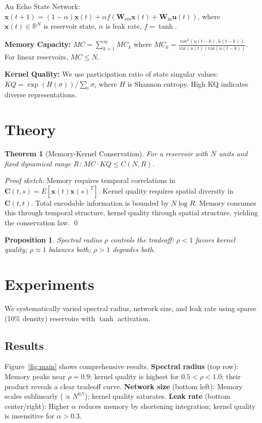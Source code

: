 \documentclass[11pt]{article}
\newtheorem{theorem}{Theorem}
\newtheorem{proposition}{Proposition}
\begin{document}
An Echo State Network: $\mathbf{x}(t+1) = (1-\alpha)\mathbf{x}(t) + \alpha f(\mathbf{W}_{\text{res}}\mathbf{x}(t) + \mathbf{W}_{\text{in}}\mathbf{u}(t))$, where $\mathbf{x}(t) \in \mathbb{R}^N$ is reservoir state, $\alpha$ is leak rate, $f = \tanh$.

\textbf{Memory Capacity:} $MC = \sum_{k=1}^{\infty} MC_k$ where $MC_k = \frac{\text{cov}^2(u(t-k), \hat{u}(t-k))}{\text{var}(u(t))\text{var}(\hat{u}(t-k))}$. For linear reservoirs, $MC \leq N$.

\textbf{Kernel Quality:} We use participation ratio of state singular values: $KQ = \exp(H(\sigma)) / \sum_i \sigma_i$ where $H$ is Shannon entropy. High KQ indicates diverse representations.

\section{Theory}

\begin{theorem}[Memory-Kernel Conservation]
For a reservoir with $N$ units and fixed dynamical range $R$: $MC \cdot KQ \leq C(N, R)$.
\end{theorem}

\textit{Proof sketch:} Memory requires temporal correlations in $\mathbf{C}(t,s) = E[\mathbf{x}(t)\mathbf{x}(s)^T]$. Kernel quality requires spatial diversity in $\mathbf{C}(t,t)$. Total encodable information is bounded by $N \log R$. Memory consumes this through temporal structure, kernel quality through spatial structure, yielding the conservation law. \qed

\begin{proposition}
Spectral radius $\rho$ controls the tradeoff: $\rho < 1$ favors kernel quality; $\rho \approx 1$ balances both; $\rho > 1$ degrades both.
\end{proposition}

\section{Experiments}

We systematically varied spectral radius, network size, and leak rate using sparse (10\% density) reservoirs with $\tanh$ activation.

\subsection{Results}

Figure~\ref{fig:main} shows comprehensive results. \textbf{Spectral radius} (top row): Memory peaks near $\rho = 0.9$; kernel quality is highest for $0.5 < \rho < 1.0$; their product reveals a clear tradeoff curve. \textbf{Network size} (bottom left): Memory scales sublinearly ($\propto N^{0.7}$); kernel quality saturates. \textbf{Leak rate} (bottom center/right): Higher $\alpha$ reduces memory by shortening integration; kernel quality is insensitive for $\alpha > 0.3$.
\end{document}
